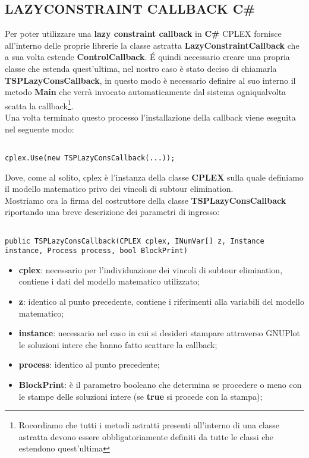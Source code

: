\documentclass[11pt]{article}
\begin{document}
\subsection*{LAZYCONSTRAINT CALLBACK C\#}
\label{sec:LazyS}

Per poter utilizzare una \textbf{lazy constraint callback} in \textbf{C\#} CPLEX fornisce all'interno delle proprie librerie la classe astratta \textbf{LazyConstraintCallback} che a sua volta estende \textbf{ControlCallback}. \'E quindi necessario creare una propria classe che estenda quest'ultima, nel nostro caso è stato deciso di chiamarla \textbf{TSPLazyConsCallback}, in questo modo è necessario definire al suo interno il metodo \textbf{Main} che verrà invocato automaticamente dal sistema ogniqualvolta scatta la callback\footnote{Rocordiamo che tutti i metodi astratti presenti all'interno di una classe astratta devono essere obbligatoriamente definiti da tutte le classi che estendono quest'ultima}.\\
Una volta terminato questo processo l'installazione della callback viene eseguita nel seguente modo:

\begin{lstlisting}

cplex.Use(new TSPLazyConsCallback(...));

\end{lstlisting}

Dove, come al solito, cplex è l'instanza della classe \textbf{CPLEX} sulla quale definiamo il modello matematico privo dei vincoli di subtour elimination.\\
Mostriamo ora la firma del costruttore della classe \textbf{TSPLazyConsCallback} riportando una breve descrizione dei parametri di ingresso:

\begin{lstlisting}

public TSPLazyConsCallback(CPLEX cplex, INumVar[] z, Instance instance, Process process, bool BlockPrint)

\end{lstlisting}

\begin{itemize}
    \item \textbf{cplex}: necessario per l'individuazione dei vincoli di subtour elimination, contiene i dati del modello matematico utilizzato;
    \item \textbf{z}: identico al punto precedente, contiene i riferimenti alla variabili del modello matematico;
    \item \textbf{instance}: necessario nel caso in cui si desideri stampare attraverso GNUPlot le soluzioni intere che hanno fatto scattare la callback;
    \item \textbf{process}: identico al punto precedente;
    \item \textbf{BlockPrint}: è il parametro booleano che determina se procedere o meno con le stampe delle soluzioni intere (se \textbf{true} si procede con la stampa);
\end{itemize}
\end{document}
